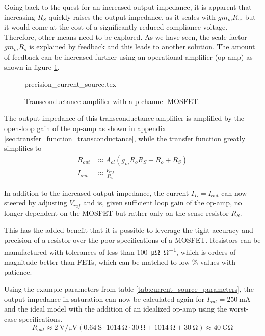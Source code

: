 Going back to the quest for an increased output impedance, it is apparent that increasing $R_S$ quickly raises the output impedance, as it scales with $gm_m R_o$, but it would come at the cost of a significantly reduced compliance voltage. Therefore, other means need to be explored. As we have seen, the scale factor $gm_m R_o$ is explained by feedback and this leads to another solution. The amount of feedback can be increased further using an operational amplifier (op-amp) as shown in figure \ref{fig:precision_current_source}.

\begin{figure}[ht]
    \centering
    {precision_current_source.tex}
    \caption{Transconductance amplifier with a p-channel MOSFET.}
    \label{fig:precision_current_source}
\end{figure}

The output impedance of this transconductance amplifier is amplified by the open-loop gain of the op-amp as shown in appendix \ref{sec:transfer_function_transconductance}, while the transfer function greatly simplifies to
\begin{align}
    R_{out} &\approx A_{ol} \left(g_m R_o R_S + R_o + R_S \right) \nonumber\\
    I_{out} &\approx \frac{V_{ref}}{R_S} \label{eqn:current_source_transfer_function}
\end{align}

In addition to the increased output impedance, the current $I_D = I_{out}$ can now steered by adjusting $V_{ref}$ and is, given sufficient loop gain of the op-amp, no longer dependent on the MOSFET but rather only on the sense resistor $R_S$.

This has the added benefit that it is possible to leverage the tight accuracy and precision of a resistor over the poor specifications of a MOSFET. Resistors can be manufactured with tolerances of less than \qty{100}{\micro \ohm \per \ohm}, which is orders of magnitude better than FETs, which can be matched to low \unit{\percent} values with patience.

Using the example parameters from table \ref{tab:current_source_parameters}, the output impedance in saturation can now be calculated again for $I_{out}=\qty{250}{\mA}$ and the ideal  model with the addition of an idealized  op-amp using the worst-case specifications.
\begin{equation}
    R_{out} \approx \qty[per-mode=power]{2}{\volt \per \uV} \left(\qty{0.64}{\siemens}\cdot \qty{1014}{\ohm} \cdot \qty{30}{\ohm} + \qty{1014}{\ohm} + \qty{30}{\ohm} \right) \approx \qty{40}{\giga\ohm} \label{eqn:current_source_output_impedance}
\end{equation}

